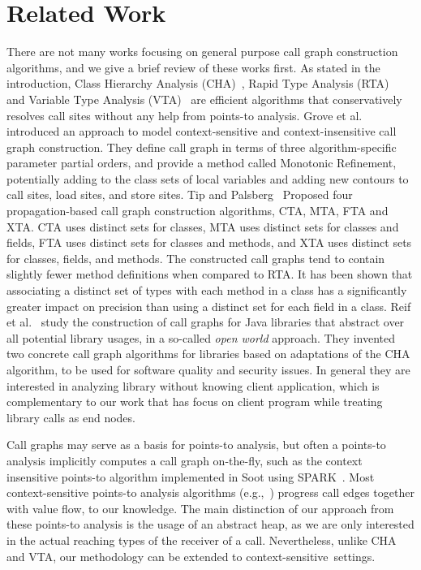 \documentclass{fac}
\begin{document}
\section{Related Work}\label{sec:related-work}
There are not many works focusing on general purpose call graph construction algorithms, and we give a brief review of these works first.
%
As stated in the introduction, Class Hierarchy Analysis (CHA)~\cite{Dean1995,Fernandez1995}, Rapid Type Analysis (RTA)~\cite{Bacon1996} and Variable Type Analysis (VTA)~\cite{Sundaresan2000} are efficient algorithms that conservatively resolves call sites without any help from points-to analysis. Grove et al.~\cite{Grove1997} introduced an approach to model context-sensitive and context-insensitive call graph construction. They define call graph in terms of three algorithm-specific parameter partial orders, and provide a method called Monotonic Refinement, potentially adding to the class sets of local variables and adding new contours to call sites, load sites, and store sites.
%
Tip and Palsberg~\cite{Tip2000} Proposed four propagation-based call graph construction algorithms, CTA, MTA, FTA and XTA. CTA uses distinct sets for classes, MTA uses distinct sets for classes and fields, FTA uses distinct sets for classes and methods, and XTA uses distinct
sets for classes, fields, and methods. The constructed call graphs tend to contain slightly fewer method definitions when compared to RTA. It has been shown that associating a distinct set of types with each method in a class has a significantly greater impact on precision than using a distinct set for each field in a class. Reif et al.~\cite{Reif2016} study the construction of call graphs for Java libraries that abstract over all potential library usages, in a so-called \emph{open world} approach. They invented two concrete call graph algorithms for libraries based on adaptations of the CHA algorithm, to be used for software quality and security issues. In general they are interested in analyzing library without knowing client application, which is complementary to our work that has focus on client program while treating library calls as end nodes.

Call graphs may serve as a basis for points-to analysis, but often a points-to analysis implicitly computes a call graph on-the-fly, such as the context insensitive points-to algorithm implemented in Soot using SPARK~\cite{Lhotak2003}. Most context-sensitive points-to analysis algorithms (e.g.,~\cite{Milanova2005,Sridharan2006,Smaragdakis11,Tan16}) progress call edges together with value flow, to our knowledge. The main distinction of our approach from these points-to analysis is the usage of an abstract heap, as we are only interested in the actual reaching types of the receiver of a call. Nevertheless, unlike CHA and VTA, our methodology can be extended to context-sensitive~settings.
\end{document}
